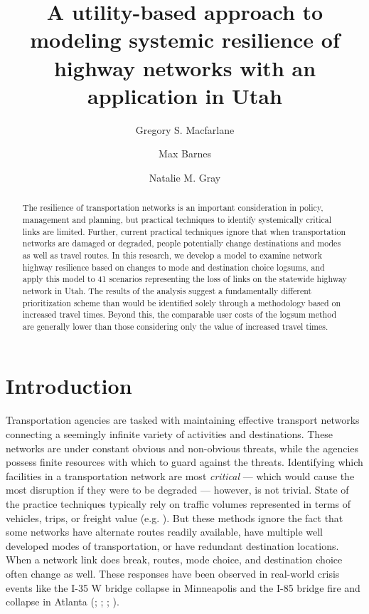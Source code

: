\documentclass[]{ascelike-new}
\title{A utility-based approach to modeling systemic resilience of
highway networks with an application in Utah}
\author[1*]{Gregory S. Macfarlane}%
\affil[1*]{
	Brigham Young University, Civil and Construction Engineering
Department; 
	Email: gregmacfarlane@byu.edu
	; Corresponding author}
\author[2]{Max Barnes}%
\affil[2]{
	Kimley-Horn; 
	Email: maxbarnes@kha.com
	}
\author[3]{Natalie M. Gray}%
\affil[3]{
	WSP; 
	Email: nat.gray2000@gmail.com
	}
\begin{document}
\maketitle

\begin{abstract}
	The resilience of transportation networks is an important consideration
in policy, management and planning, but practical techniques to identify
systemically critical links are limited. Further, current practical
techniques ignore that when transportation networks are damaged or
degraded, people potentially change destinations and modes as well as
travel routes. In this research, we develop a model to examine network
highway resilience based on changes to mode and destination choice
logsums, and apply this model to 41 scenarios representing the loss of
links on the statewide highway network in Utah. The results of the
analysis suggest a fundamentally different prioritization scheme than
would be identified solely through a methodology based on increased
travel times. Beyond this, the comparable user costs of the logsum
method are generally lower than those considering only the value of
increased travel times.
\end{abstract}

\par
\vspace{1em}


\section{Introduction}\label{intro}

Transportation agencies are tasked with maintaining effective transport
networks connecting a seemingly infinite variety of activities and
destinations. These networks are under constant obvious and non-obvious
threats, while the agencies possess finite resources with which to guard
against the threats. Identifying which facilities in a transportation
network are most \emph{critical} --- which would cause the most
disruption if they were to be degraded --- however, is not trivial.
State of the practice techniques typically rely on traffic volumes
represented in terms of vehicles, trips, or freight value (e.g.
). But these methods ignore the fact
that some networks have alternate routes readily available, have
multiple well developed modes of transportation, or have redundant
destination locations. When a network link does break, routes, mode
choice, and destination choice often change as well. These responses
have been observed in real-world crisis events like the I-35 W bridge
collapse in Minneapolis and the I-85 bridge fire and collapse in Atlanta
(;
;
;
).
\end{document}
